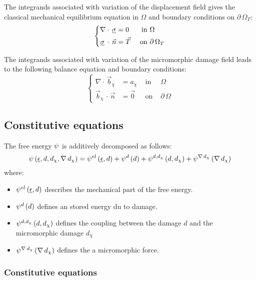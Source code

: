 The integrands associated with variation of the displacement field gives
the classical mechanical equilibrium equation in \(\Omega\) and boundary
conditions on \(\partial\,\Omega_{T}\):
\[
\left\{
\begin{aligned}
\nabla \cdot\,\underline{\sigma} &= 0       & \text{ in } & \Omega \\
\underline{\sigma}\,\cdot\,\vec{n}&=\vec{T} & \text{ on } & \partial\,\Omega_{T}
\end{aligned}
\right.
\]\label{eq:micromorphicdamage:mechanical_equilibrium}

The integrands associated with variation of the micromorphic damage field
leads to the following balance equation and boundary conditions:
\[
\left\{
\begin{aligned}
\nabla \cdot\,\vec{b}_{\chi} &= a_{\chi} &\text{ in }& \Omega \\
\vec{b}_{\chi}\,\cdot\,\vec{n}&=\vec{0} &\text{ on }& \partial\,\Omega
\end{aligned}
\right.
\]\label{eq:micromorphicdamage:d_chi}

\subsection{Constitutive equations}
\label{sec:micromorphicdamage:constitutive_equations}

The free energy \(\psi\) is additively decomposed as follows:
\[
\psi\left(\underline{\epsilon}, d, d_{\chi}, \nabla\,d_{\chi}\right)=
{\psi}^{el}\left(\underline{\epsilon}, d\right)+
{\psi}^{d}\left(d\right)+
{\psi}^{d, d_{\chi}}\left(d, d_{\chi}\right)+
{\psi}^{\nabla\,d_{\chi}}\left(\nabla\,d_{\chi}\right)
\]
where:

\begin{itemize}
    \item \({\psi}^{el}\left(\underline{\epsilon}, d\right)\) describes the mechanical part of
    the free energy.
    \item \({\psi}^{d}\left(d\right)\) defines an stored energy du to damage.
    \item \({\psi}^{d, d_{\chi}}\left(d, d_{\chi}\right)\) defines the coupling between
    the damage \(d\) and the micromorphic damage \(d_{\chi}\)
    \item \({\psi}^{\nabla\,d_{\chi}}\left(\nabla\, d_{\chi}\right)\) defines the a
    micromorphic force.
\end{itemize}

\subsubsection{Constitutive equations}

